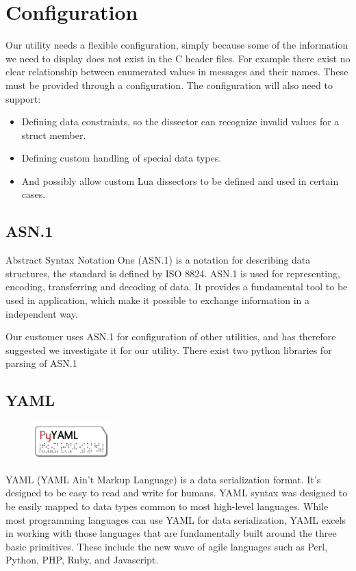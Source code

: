 \section{Configuration}
\label{sec:pre:config}
Our utility needs a flexible configuration, simply because some of the
information we need to display does not exist in the C header files. For
example there exist no clear relationship between enumerated values in messages
and their names. These must be provided through a configuration. The
configuration will also need to support:
\begin{itemize}
	\item Defining data constraints, so the dissector can recognize invalid
		values for a struct member.
	\item Defining custom handling of special data types.
	\item  And possibly allow custom Lua dissectors to be defined and used in
		certain cases.
\end{itemize}

\subsection{ASN.1}
Abstract Syntax Notation One (ASN.1) is a notation for describing data
structures, the standard is defined by ISO 8824. ASN.1 is used for
representing, encoding, transferring and decoding of data. It provides a
fundamental tool to be used in application, which make it possible to exchange
information in a independent way.

Our customer uses ASN.1 for configuration of other utilities, and has therefore
suggested we investigate it for our utility. There exist two python libraries
for parsing of ASN.1

\subsection{YAML}
\begin{figure}
	\begin{center}
	\vspace{-30pt}
		\includegraphics[width=3cm]{./planning/img/pyyaml_logo}
	\vspace{-30pt}
	\end{center}
\end{figure}
YAML (YAML Ain't Markup Language) is a data serialization format. It's designed
to be easy to read and write for humans. YAML syntax was designed to be easily
mapped to data types common to most high-level languages. While most
programming languages can use YAML for data serialization, YAML excels in
working with those languages that are fundamentally built around the three
basic primitives. These include the new wave of agile languages such as Perl,
Python, PHP, Ruby, and Javascript.

